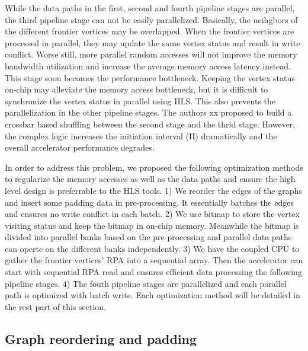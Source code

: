 While the data paths in the first, second and fourth pipeline stages are parallel,
the third pipeline stage can not be easily parallelized. Basically, the neihgbors of 
the different frontier vertices may be overlapped. When the frontier vertices are 
processed in parallel, they may update the same vertex status and result in write 
conflict. Worse still, more parallel random accesses will not improve the memory 
bandwidth utilization and increase the average memory access latency instead. 
This stage soon becomes the performance bottleneck. Keeping the vertex status on-chip 
may alleviate the memory access bottleneck, but it is difficult to synchronize the 
vertex status in parallel using HLS. This also prevents the parallelization in the 
other pipeline stages. The authors xx proposed to build a crossbar based shuffling 
between the second stage and the thrid stage. However, the complex logic increases the 
initiation interval (II) dramatically and the overall accelerator performance degrades.

In order to address this problem, we proposed the following optimization methods 
to regularize the memory accesses as well as the data paths and ensure the high level 
design is preferrable to the HLS tools. 1) We reorder the edges of the graphs and insert 
some padding data in pre-processing. It essentially batches the edges and ensures 
no write conflict in each batch. 2) We use bitmap to store the vertex visiting status and 
keep the bitmap in on-chip memory. Meanwhile the bitmap is divided into parallel banks 
based on the pre-processing and parallel data paths can operte on the different 
banks independently. 3) We have the coupled CPU to gather the frontier vertices' RPA into 
a sequential array. Then the accelerator can start with sequential RPA read and ensures 
efficient data processing the following pipeline stages. 4) The fouth pipeline stages 
are parallelized and each parallel path is optimized with batch write. Each optimization method
will be detailed in the rest part of this section.

\subsection{Graph reordering and padding}

